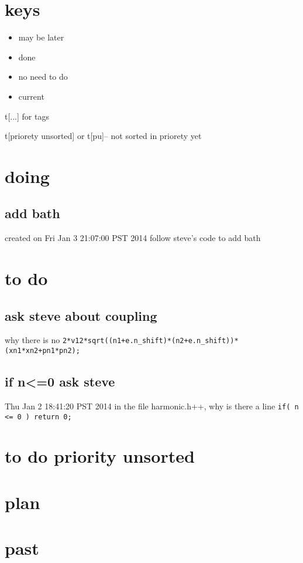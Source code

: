 \documentclass{article}
\let\Item\item
\renewcommand\item{\normalcolor\Item}
\newcommand\ml{\color[RGB]{153, 150, 204}} %
\newcommand\nn{\color[RGB]{124, 124, 255}} %
\newcommand\done{\color[RGB]{129, 180, 185} \ding{52} }
\newcommand\now{\color[RGB]{255, 0, 0}} %
\begin{document}
\section{keys}
\begin{itemize}
  \item \ml may be later
  \item \done done
  \item \nn no need to do
  \item \now current 
\end{itemize}

t[...] for tags

t[priorety unsorted] or t[pu]-- not sorted in priorety yet

\section{doing}
\subsection{add bath}
created on Fri Jan  3 21:07:00 PST 2014
\label{sub:add_bath}
follow steve's code to add bath
\section{to do}
\subsection{ask steve about coupling}
\label{sub:ask_steve_about_coupling}
why there is no \verb`2*v12*sqrt((n1+e.n_shift)*(n2+e.n_shift))*(xn1*xn2+pn1*pn2);`
\subsection{if n<=0 ask steve}
Thu Jan  2 18:41:20 PST 2014
\label{sub:if_n_0_ask_steve}
in the file harmonic.h++, why is there a line \verb`if( n <= 0 ) return 0;`
\section{to do priority unsorted}
\section{plan}
\section{past}
\end{document}
